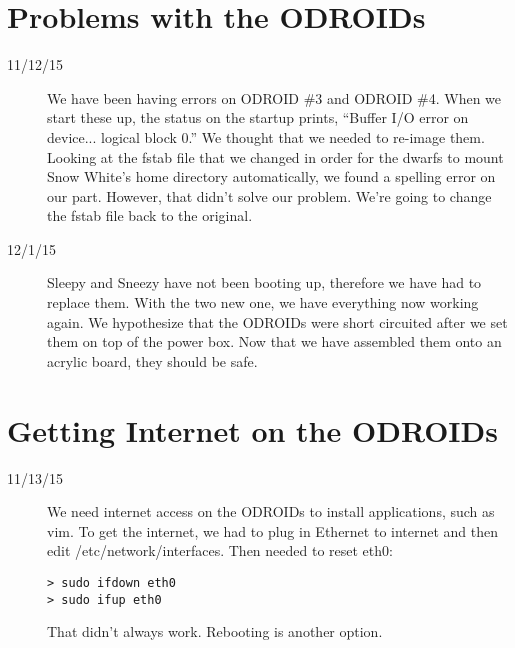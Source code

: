 \section{Problems with the ODROIDs}
\begin{description}
\item [11/12/15] We have been having errors on ODROID \#3 and ODROID \#4. When we start these up, the status on the startup prints, ``Buffer I/O error on device... logical block 0.'' We thought that we needed to re-image them. Looking at the fstab file that we changed in order for the dwarfs to mount Snow White's home directory automatically, we found a spelling error on our part. However, that didn't solve our problem. We're going to change the fstab file back to the original. \\
\item [12/1/15] Sleepy and Sneezy have not been booting up, therefore we have had to replace them. With the two new one, we have everything now working again. We hypothesize that the ODROIDs were short circuited after we set them on top of the power box. Now that we have assembled them onto an acrylic board, they should be safe.
\end{description}

\section{Getting Internet on the ODROIDs}
\begin{description}
\item [11/13/15] We need internet access on the ODROIDs to install applications, such as vim. To get the internet, we had to plug in Ethernet to internet and then edit /etc/network/interfaces. Then needed to reset eth0:
\begin{lstlisting}
> sudo ifdown eth0
> sudo ifup eth0
\end{lstlisting}
That didn't always work. Rebooting is another option.
\end{description}

